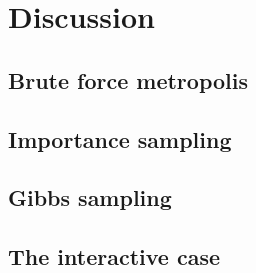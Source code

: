 \section{Discussion}
\subsection{Brute force metropolis}

\subsection{Importance sampling}

\subsection{Gibbs sampling}

\subsection{The interactive case}